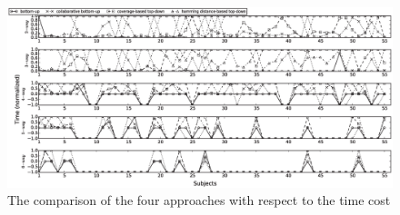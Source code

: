 \documentclass[conference]{IEEEtran}
\theoremstyle{definition}
\begin{document}
\begin{figure}[htbp]
\center
 \includegraphics[width=7.4in]{time-degree.eps}
\caption{The comparison of  the four approaches with respect to the time cost}
\label{experiement_time}
\end{figure}
\end{document}
